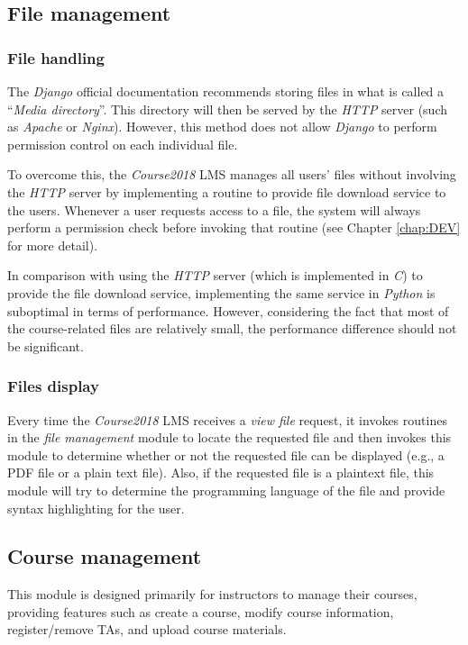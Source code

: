 \subsection{File management}

\subsubsection{File handling}
The \emph{Django} official documentation recommends storing files in what is
called a ``\emph{Media directory}''. This directory will then be served by the
\emph{HTTP} server \cite{CdjangoManagingFiles}
(such as \emph{Apache} or \emph{Nginx}). However, this method does not allow
\emph{Django} to perform permission control on each individual file.

\medskip

To overcome this, the \emph{Course2018} LMS manages all users' files without
involving the \emph{HTTP} server by implementing a routine to provide file
download service to the users. Whenever a user requests access to a file, the system
will always perform a permission check before invoking that routine
(see Chapter \ref{chap:DEV} for more detail).

\medskip

In comparison with
using the \emph{HTTP} server (which is implemented in \emph{C}) to provide
the file download service,
implementing the same service in \emph{Python} is suboptimal in terms of
performance.
However, considering the fact that most of the course-related
files are relatively small, the performance difference should
not be significant.

\subsubsection{Files display}
Every time the \emph{Course2018} LMS receives a \emph{view file} request,
it invokes routines in the \emph{file management} module to locate the
requested file and then invokes this module to determine whether or not the
requested file can be displayed (e.g., a PDF file or a plain text file). Also,
if the requested file is a plaintext file, this module will try to determine
the programming language of the file and provide syntax highlighting for the
user.

\subsection{Course management}
This module is designed primarily for instructors to manage their courses, 
providing features such as create a course, modify course information,
register/remove TAs, and upload course materials.

